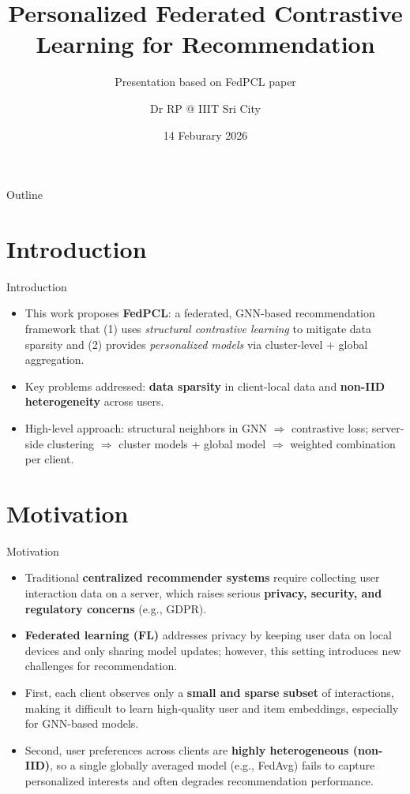 \documentclass{beamer}
\author{Dr RP @ IIIT Sri City}
\title{Personalized Federated Contrastive Learning for Recommendation}
\subtitle{Presentation based on FedPCL paper}
\institute{IIIT Sri City — Group Project}
\date{14 Feburary 2026}
\begin{document}
\begin{frame}
  \titlepage
\end{frame}

\begin{frame}{Outline}
  \tableofcontents[sectionstyle=show,subsectionstyle=show/shaded/hide]
\end{frame}

\section{Introduction}
\begin{frame}{Introduction}
  \begin{itemize}
    \item This work proposes \textbf{FedPCL}: a federated, GNN-based recommendation framework that (1) uses \emph{structural contrastive learning} to mitigate data sparsity and (2) provides \emph{personalized models} via cluster-level + global aggregation.
    \item Key problems addressed: \textbf{data sparsity} in client-local data and \textbf{non-IID heterogeneity} across users.
    \item High-level approach: structural neighbors in GNN $\Rightarrow$ contrastive loss; server-side clustering $\Rightarrow$ cluster models + global model $\Rightarrow$ weighted combination per client.
  \end{itemize}
\end{frame}

\section{Motivation}
\begin{frame}{Motivation}
\small
\begin{itemize}
  \item Traditional \textbf{centralized recommender systems} require collecting user interaction data on a server, which raises serious \textbf{privacy, security, and regulatory concerns} (e.g., GDPR).
  
  \item \textbf{Federated learning (FL)} addresses privacy by keeping user data on local devices and only sharing model updates; however, this setting introduces new challenges for recommendation.

  \item First, each client observes only a \textbf{small and sparse subset} of interactions, making it difficult to learn high-quality user and item embeddings, especially for GNN-based models.

  \item Second, user preferences across clients are \textbf{highly heterogeneous (non-IID)}, so a single globally averaged model (e.g., FedAvg) fails to capture personalized interests and often degrades recommendation performance.
\end{itemize}
\end{frame}
\end{document}
